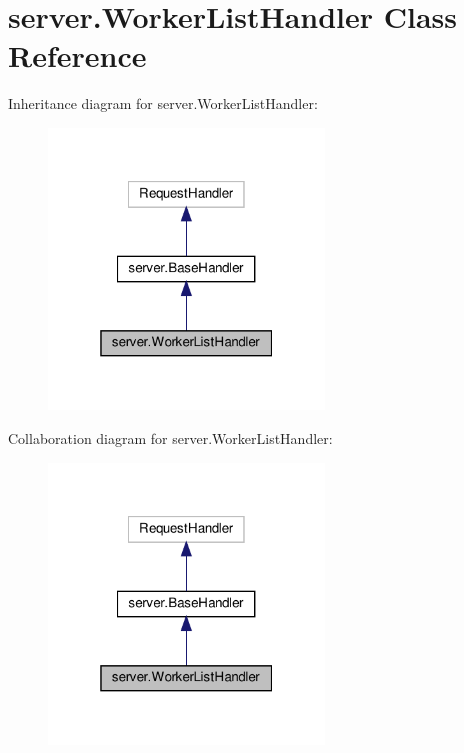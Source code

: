 \hypertarget{classserver_1_1WorkerListHandler}{}\section{server.\+Worker\+List\+Handler Class Reference}
\label{classserver_1_1WorkerListHandler}


Inheritance diagram for server.\+Worker\+List\+Handler\+:
\nopagebreak
\begin{figure}[H]
\begin{center}
\leavevmode
\includegraphics[width=208pt]{classserver_1_1WorkerListHandler__inherit__graph}
\end{center}
\end{figure}


Collaboration diagram for server.\+Worker\+List\+Handler\+:
\nopagebreak
\begin{figure}[H]
\begin{center}
\leavevmode
\includegraphics[width=208pt]{classserver_1_1WorkerListHandler__coll__graph}
\end{center}
\end{figure}
